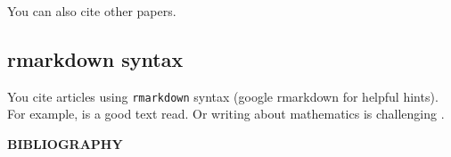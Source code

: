 \documentclass[12pt,,letterpaper,twoside]{report}
\begin{document}
You can also cite other papers.

\hypertarget{rmarkdown-syntax}{%
\subsection{rmarkdown syntax}\label{rmarkdown-syntax}}

You cite articles using \texttt{rmarkdown} syntax (google rmarkdown for
helpful hints). For example, \citet{halmos1970howto} is a good text
read. Or writing about mathematics is challenging
\citep{halmos1970howto}.



\clearpage
{}

{\def\chapter*#1{} %
\begin{singlespace}
\begin{center}
\normalsize \textbf{BIBLIOGRAPHY}
\vspace{17pt}
\end{center}



\end{singlespace}
}
\end{document}
